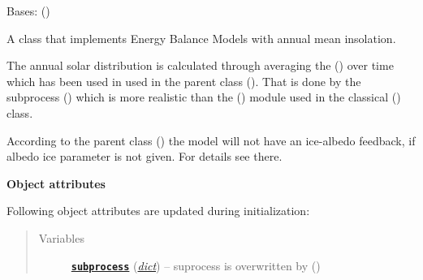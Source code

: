 \documentclass[a4paper,10pt,english]{sphinxmanual}
\begin{document}

\begin{fulllineitems}
\label{api/climlab.model:climlab.model.ebm.EBM_annual}
Bases: {\hyperref[api/climlab.model:climlab.model.ebm.EBM_seasonal]{\emph{}}} ()

A class that implements Energy Balance Models with annual mean insolation.

The annual solar distribution is calculated through averaging the 
{\hyperref[api/climlab.radiation:climlab.radiation.insolation.DailyInsolation]{\emph{}}} () over time 
which has been used in used in the parent class
{\hyperref[api/climlab.model:climlab.model.ebm.EBM_seasonal]{\emph{}}} (). That is done by the subprocess
{\hyperref[api/climlab.radiation:climlab.radiation.insolation.AnnualMeanInsolation]{\emph{}}} () which is
more realistic than the {\hyperref[api/climlab.radiation:climlab.radiation.insolation.P2Insolation]{\emph{}}} ()
module used in the classical {\hyperref[api/climlab.model:climlab.model.ebm.EBM]{\emph{}}} () class.

According to the parent class {\hyperref[api/climlab.model:climlab.model.ebm.EBM_seasonal]{\emph{}}} ()
the model will not have an ice-albedo feedback, if albedo ice parameter
 is not given. For details see there.

\textbf{Object attributes}

Following object attributes are updated during initialization:
\begin{quote}\begin{description}
\item[{Variables}] \leavevmode
\href{http://docs.python.org/2.7/library/subprocess.html\#module-subprocess}{\textbf{\texttt{subprocess}}} (\href{http://docs.python.org/2.7/library/stdtypes.html\#dict}{\emph{dict}}) -- suprocess  is overwritten by
{\hyperref[api/climlab.radiation:climlab.radiation.insolation.AnnualMeanInsolation]{\emph{}}} ()


\end{description}
\end{quote}
\end{fulllineitems}
\end{document}
